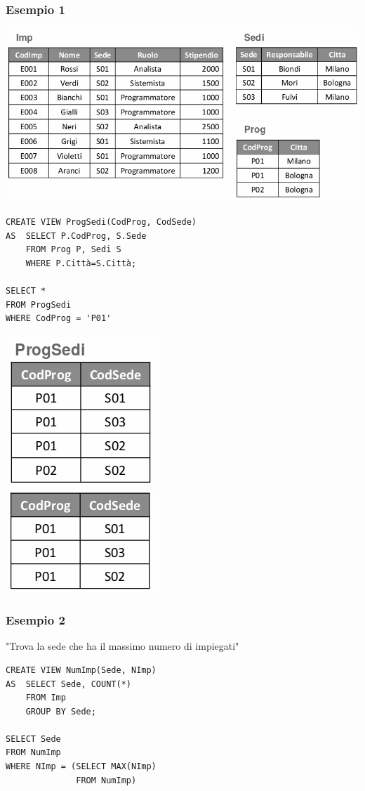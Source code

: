\documentclass[a4paper]{article}
\begin{document}
\subsubsection{Esempio 1}
\begin{center}
      \includegraphics[scale=0.4]{img/sql3.png}
\end{center}
\begin{verbatim}
CREATE VIEW ProgSedi(CodProg, CodSede)
AS  SELECT P.CodProg, S.Sede
    FROM Prog P, Sedi S
    WHERE P.Città=S.Città;

SELECT *
FROM ProgSedi
WHERE CodProg = 'P01'
\end{verbatim}
\begin{center}
      \includegraphics[scale=0.5]{img/sql4.png} \ \ \ \ \ \ \ \ \ \ \ \
      \includegraphics[scale=0.5]{img/sql5.png}
\end{center}

\subsubsection{Esempio 2}
"Trova la sede che ha il massimo numero di impiegati"
\begin{verbatim}
CREATE VIEW NumImp(Sede, NImp)
AS  SELECT Sede, COUNT(*)
    FROM Imp
    GROUP BY Sede;

SELECT Sede
FROM NumImp
WHERE NImp = (SELECT MAX(NImp)
              FROM NumImp)
\end{verbatim}
\end{document}
